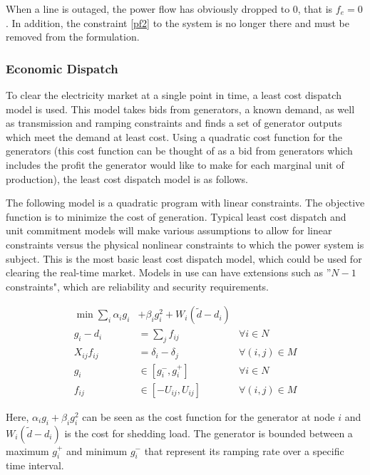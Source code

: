 When a line is outaged, the power flow has obviously dropped to 0, that is $f_e = 0$.  In addition, the constraint \ref{pf2} to the system is no longer there and must be removed from the formulation.

\subsubsection{Economic Dispatch}
To clear the electricity market at a single point in time, a least cost dispatch model is used.  This model takes bids from generators, a known demand, as well as transmission and ramping constraints and finds a set of generator outputs which meet the demand at least cost.  Using a quadratic cost function for the generators (this cost function can be thought of as a bid from generators which includes the profit the generator would like to make for each marginal unit of production), the least cost dispatch model is as follows. 

The following model is a quadratic program with linear constraints.  The objective function is to minimize the cost of generation.  Typical least cost dispatch and unit commitment models will make various assumptions to allow for linear constraints versus the physical nonlinear constraints to which the power system is subject.  This is the most basic least cost dispatch model, which could be used for clearing the real-time market.  Models in use can have extensions such as ''$N-1$ constraints", which are reliability and security requirements.

\begin{subequations}
\begin{align}
 \min \sum_i \alpha_i g_i &+ \beta_i g_i^2	+ W_i(\tilde{d} - d_i)&	\\
g_i - d_i &= \sum_j f_{ij}	&	\forall i \in N 	\\
X_{ij} f_{ij} &= \delta_i - \delta_j & \forall (i,j) \in M \\
g_i  &\in \left[ g_i^- , g_i^+ \right]		&	\forall i \in N 	\\
f_{ij} &\in \left[ -U_{ij}, U_{ij} \right]	&	\forall (i,j) \in M 
\end{align}
\label{leastcostdispatch}
\end{subequations}

Here, $\alpha_i g_i + \beta_i g_i^2$ can be seen as the cost function for the generator at node $i$ and $W_i(\tilde{d} - d_i)$ is the cost for shedding load.  The generator is bounded between a maximum $g_i^+$ and minimum $g_i^-$ that represent its ramping rate over a specific time interval.  

